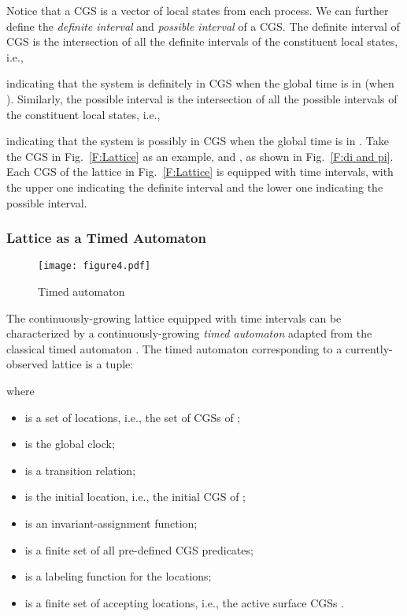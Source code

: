 \documentclass[10pt,conference,compsocconf,letterpaper]{IEEEtran}
\begin{document}
Notice that a CGS is a vector of local states from each process. We can further define the \textit{definite interval} and \textit{possible interval} of a CGS. The definite interval  of CGS  is the intersection of all the definite intervals of the constituent local states, i.e.,

indicating that the system is definitely in CGS  when the global time is in  (when ). Similarly, the possible interval  is the intersection of all the possible intervals of the constituent local states, i.e.,

indicating that the system is possibly in CGS  when the global time is in . Take the CGS  in Fig.~\ref{F:Lattice} as an example,  and , as shown in Fig.~\ref{F:di and pi}. Each CGS of the lattice in Fig.~\ref{F:Lattice} is equipped with time intervals, with the upper one indicating the definite interval and the lower one indicating the possible interval.

\subsubsection{Lattice as a Timed Automaton}\label{sec:lattice as a TA}
\begin{figure}[tbp]
\begin{center}
  \texttt{[image: figure4.pdf]}
  \caption{Timed automaton }
  \label{F:timed automaton}
\end{center}
\end{figure}

The continuously-growing lattice equipped with time intervals can be characterized by a continuously-growing \textit{timed automaton} adapted from the classical timed automaton \cite{Alur94, Baier08}. The timed automaton corresponding to a currently-observed lattice is a tuple:

where
\begin{itemize}\setlength{\itemsep}{0pt}
    \item  is a set of locations, i.e., the set of CGSs of ;
    \item  is the global clock;
    \item  is a transition relation;
    \item  is the initial location, i.e., the initial CGS  of ;
    \item  is an invariant-assignment function;
    \item  is a finite set of all pre-defined CGS predicates;
    \item  is a labeling function for the locations;
    \item  is a finite set of accepting locations, i.e., the active surface CGSs .
\end{itemize}
\end{document}
